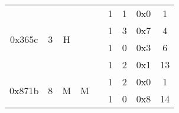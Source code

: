 \documentclass[11pt]{homework}
\newcommand{\cmark}{\ding{51}}%
\begin{document}
\begin{arabicparts}
{\begin{tabular}{|c|c|c|c|c|c|c|c|c|}
            \hline
            \multirow{4}{*}{0x365c}  & \multirow{4}{*}{3}                                                     & \multirow{4}{*}{H}                                                & \multirow{4}{*}{}                                                  & \multirow{4}{*}{}                                                    & 1                        & 1         & 0x0 & 1             \\
            \cline{6-9}
                                     &                                                                        &                                                                   &                                                                    &                                                                      & 1                        & 3         & 0x7 & 4             \\
            \cline{6-9}
                                     &                                                                        &                                                                   &                                                                    &                                                                      & 1                        & 0         & 0x3 & 6             \\
            \cline{6-9}
                                     &                                                                        &                                                                   &                                                                    &                                                                      & 1                        & 2         & 0x1 & 13            \\
            \hline
            \multirow{4}{*}{0x871b}  & \multirow{4}{*}{8}                                                     & \multirow{4}{*}{M}                                                & \multirow{4}{*}{M}                                                 & \multirow{4}{*}{\cmark}                                              & 1                        & 2         & 0x0 & 1             \\
            \cline{6-9}
                                     &                                                                        &                                                                   &                                                                    &                                                                      & 1                        & 0         & 0x8 & 14            \\

\end{tabular}}
\end{arabicparts}
\end{document}
